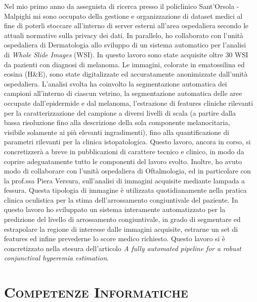 \documentclass[a4paper,11pt]{article}
\begin{document}
Nel mio primo anno da assegnista di ricerca presso il policlinico Sant'Orsola - Malpighi mi sono occupato della gestione e organizzazione di dataset medici al fine di poterli stoccare all'interno di server esterni all'area ospedaliera secondo le attuali normative sulla privacy dei dati.
In parallelo, ho collaborato con l'unità ospedaliera di Dermatologia allo sviluppo di un sistema automatico per l'analisi di \emph{Whole Slide Images} (WSI).
In questo lavoro sono state acquisite oltre 30 WSI da pazienti con diagnosi di melanoma.
Le immagini, colorate in ematossilina ed eosina (H\&E), sono state digitalizzate ed accuratamente anonimizzate dall'unità ospedaliera.
L'analisi svolta ha coinvolto la segmentazione automatica dei campioni all'interno di ciascun vetrino, la segmentazione automatica delle aree occupate dall'epidermide e dal melanoma, l'estrazione di features cliniche rilevanti per la caratterizzazione del campione a diversi livelli di scala (a partire dalla bassa risoluzione fino alla descrizione della sola componente melanocitaria, visibile solamente ai più elevanti ingradimenti), fino alla quantificazione di parametri rilevanti per la clinica istopatologica.
Questo lavoro, ancora in corso,%
si concretizzerà a breve in pubblicazioni di carattere tecnico e clinico, in modo da coprire adeguatamente tutto le componenti del lavoro svolto.
Inoltre, ho avuto modo di collaborare con l'unità ospedaliera di Oftalmologia, ed in particolare con la prof.ssa Piera Versura, sull'analisi di immagini acquisite mediante lampada a fessura.
Questa tipologia di immagine è utilizzata quotidianamente nella pratica clinica oculistica per la stima dell'arrossamento congiuntivale del paziente.
In questo lavoro ho sviluppato un sistema interamente automatizzato per la predizione del livello di arrossamento congiuntivale, in grado di segmentare ed estrapolare la regione di interesse dalle immagini acquisite, estrarne un set di features ed infine prevederne lo score medico richiesto.
Questo lavoro si è concretizzato nella stesura dell'articolo \emph{A fully automated pipeline for a robust conjunctival hyperemia estimation}.


\vspace*{0.5cm}
\section*{\scshape{Competenze Informatiche}}
\end{document}
